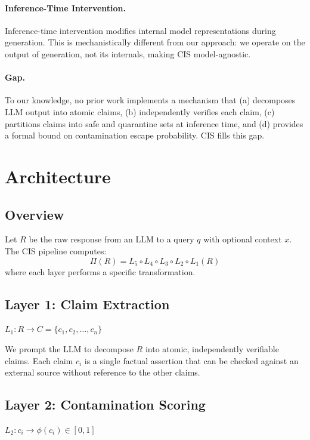 \documentclass[11pt,a4paper]{article}
\begin{document}
\paragraph{Inference-Time Intervention.} Inference-time intervention \citep{li2024inference} modifies internal model representations during generation. This is mechanistically different from our approach: we operate on the output of generation, not its internals, making CIS model-agnostic.

\paragraph{Gap.} To our knowledge, no prior work implements a mechanism that (a) decomposes LLM output into atomic claims, (b) independently verifies each claim, (c) partitions claims into safe and quarantine sets at inference time, and (d) provides a formal bound on contamination escape probability. CIS fills this gap.

\section{Architecture}

\subsection{Overview}

Let $R$ be the raw response from an LLM to a query $q$ with optional context $x$. The CIS pipeline computes:
\[
\Pi(R) = L_5 \circ L_4 \circ L_3 \circ L_2 \circ L_1(R)
\]
where each layer performs a specific transformation.

\subsection{Layer 1: Claim Extraction}

$L_1: R \to C = \{c_1, c_2, \ldots, c_n\}$

We prompt the LLM to decompose $R$ into atomic, independently verifiable claims. Each claim $c_i$ is a single factual assertion that can be checked against an external source without reference to the other claims.

\subsection{Layer 2: Contamination Scoring}

$L_2: c_i \to \phi(c_i) \in [0, 1]$
\end{document}
